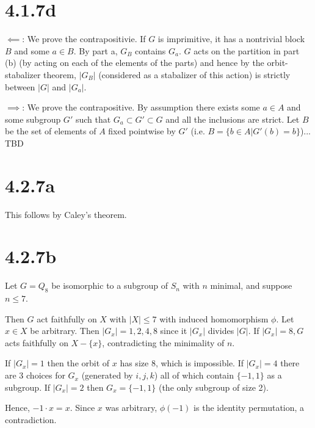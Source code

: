 \documentclass{article}
\begin{document}
\section*{4.1.7d}

$\impliedby$: We prove the contrapositivie. If $G$ is imprimitive, it has a nontrivial block $B$ and some $a \in B$. By part a, $G_B$ contains $G_a$. $G$ acts on the partition in part (b) (by acting on each of the elements of the parts) and hence by the orbit-stabalizer theorem, $|G_B|$ (considered as a stabalizer of this action) is strictly between $|G|$ and $|G_a|$.

$\implies$: We prove the contrapositive. By assumption there exists some $a \in A$ and some subgroup $G'$ such that $G_a \subset G' \subset G$ and all the inclusions are strict. Let $B$ be the set of elements of $A$ fixed pointwise by $G'$ (i.e. $B = \{b \in A | G'(b) = b\}$)... TBD

\section*{4.2.7a}

This follows by Caley's theorem.

\section*{4.2.7b}

Let $G = Q_8$ be isomorphic to a subgroup of $S_n$ with $n$ minimal, and suppose $n \le 7$.

Then $G$ act faithfully on $X$ with $|X| \le 7$ with induced homomorphism $\phi$. Let $x \in X$ be arbitrary. Then $|G_x| = 1, 2, 4, 8$ since it $|G_x|$ divides $|G|$. If $|G_x| = 8, G$ acts faithfully on $X - \{x\}$, contradicting the minimality of $n$. 

If $|G_x| = 1$ then the orbit of $x$ has size 8, which is impossible. If $|G_x| = 4$ there are 3 choices for $G_x$ (generated by $i, j, k$) all of which contain $\{-1, 1\}$ as a subgroup. If $|G_x| = 2$ then $G_x = \{-1, 1\}$ (the only subgroup of size 2).

Hence, $-1 \cdot x = x$. Since $x$ was arbitrary, $\phi(-1)$ is the identity permutation, a contradiction.
\end{document}

